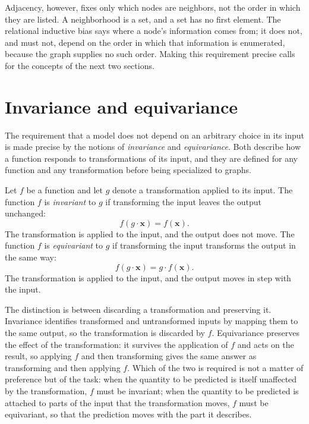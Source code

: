 Adjacency, however, fixes only which nodes are neighbors, not the order in which
they are listed. A neighborhood is a set, and a set has no first element. The
relational inductive bias says where a node's information comes from; it does
not, and must not, depend on the order in which that information is enumerated,
because the graph supplies no such order. Making this requirement precise calls
for the concepts of the next two sections.

\section{Invariance and equivariance}
\label{sec:invariance-equivariance}

The requirement that a model does not depend on an arbitrary choice in its input is
made precise by the notions of \textit{invariance} and \textit{equivariance}. 
Both describe how a function responds to transformations of its input, 
and they are defined for any function and any transformation 
before being specialized to graphs.

Let $f$ be a function and let $g$ denote a transformation applied to its input.
The function $f$ is \textit{invariant} to $g$ if transforming the input leaves
the output unchanged:
\begin{equation}
  f(g \cdot \mathbf{x}) = f(\mathbf{x}).
  \label{eq:invariance}
\end{equation}
The transformation is applied to the input, and the output does not move. The
function $f$ is \textit{equivariant} to $g$ if transforming the input
transforms the output in the same way:
\begin{equation}
  f(g \cdot \mathbf{x}) = g \cdot f(\mathbf{x}).
  \label{eq:equivariance}
\end{equation}
The transformation is applied to the input, and
the output moves in step with the input.

The distinction is between discarding a transformation and preserving it.
Invariance identifies transformed and untransformed inputs by mapping 
them to the same output, so the transformation is discarded by $f$. 
Equivariance preserves the effect of the transformation:
it survives the application of $f$ and acts on the result, so applying $f$
and then transforming gives the same answer as transforming and then applying
$f$. Which of the two is required is not a matter of preference but of the task:
when the quantity to be predicted is itself unaffected by the transformation,
$f$ must be invariant; when the quantity to be predicted is attached to parts of
the input that the transformation moves, $f$ must be equivariant, so that the
prediction moves with the part it describes.


